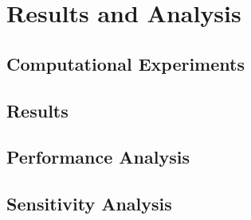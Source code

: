 \section{Results and Analysis}

\subsection{Computational Experiments}

\subsection{Results}

\subsection{Performance Analysis}

\subsection{Sensitivity Analysis}

